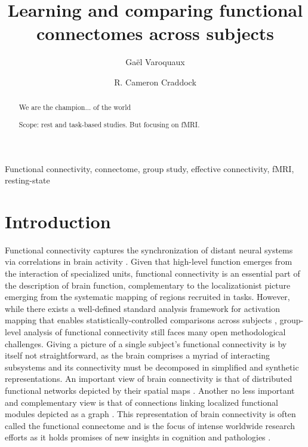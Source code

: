 \documentclass[5p]{elsarticle}
\begin{document}
\title{Learning and comparing functional connectomes across subjects}


\author[parietal,unicog,cea]{Ga\"el Varoquaux}
\author[cmi,nki]{R. Cameron Craddock}


\address[parietal]{Parietal project-team, INRIA Saclay-\^ile de France}
\address[unicog]{INSERM, U992}
\address[cea]{CEA/Neurospin b\^at 145, 91191 Gif-Sur-Yvette}
\address[cmi]{Child Mind Institute, New York, New York}
\address[nki]{Nathan Kline Institute for Psychiatric Research, Orangeburg, New York}

\begin{abstract}
    We are the champion... of the world

    Scope: rest and task-based studies. But focusing on fMRI.
\end{abstract}

\begin{keyword}
    Functional connectivity, connectome, group study, effective
    connectivity, fMRI, resting-state
\end{keyword}

\maketitle

\sloppy %

\section{Introduction}

Functional connectivity captures the synchronization of distant
neural systems via correlations in brain activity
\cite{biswal1995,cordes2000}. Given that high-level
function emerges from the interaction of specialized units, functional
connectivity is an essential part of the description of brain function,
complementary to the localizationist picture emerging from the systematic
mapping of regions recruited in tasks. However, while there exists a
well-defined standard analysis framework for activation mapping that enables
statistically-controlled comparisons across subjects \cite{friston1995},
group-level analysis of functional connectivity still faces many open
methodological challenges. Giving a picture of a single subject's 
functional connectivity is by itself not straightforward, as the brain
comprises a myriad of interacting subsystems and its connectivity must 
be decomposed in
simplified and synthetic representations. An important view of brain
connectivity is that of distributed functional networks depicted by their
spatial maps \cite{fox2005}. Another no less important and complementary
view is that of connections linking localized functional modules depicted
as a graph \cite{bullmore2009}. This representation of brain connectivity
is often called the functional connectome \cite{sporns2005} and is the
focus of intense worldwide research efforts as it holds promises of new
insights in cognition and pathologies
\cite{greicius2008b,biswal2010,fox2010}.
\end{document}
